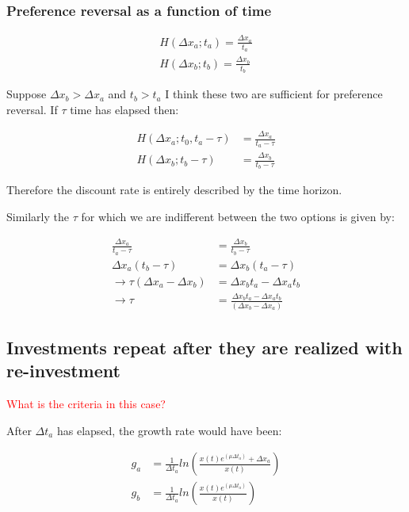 \documentclass{article}
\begin{document}
\subsubsection{Preference reversal as a function of time}

\begin{align*}
H(\Delta x_a; t_{a}) = \frac{\Delta x_a }{t_a} \\
H(\Delta x_b;t_{b}) = 
\frac{\Delta x_b}{t_b} 
\end{align*}

Suppose $\Delta x_b>\Delta x_a$ and $t_{b}>t_a$ I think these two are sufficient for preference reversal. If $\tau$ time has elapsed then:

\begin{align*}
H(\Delta x_a; t_0, t_{a}-\tau) &= \frac{\Delta x_a}{t_a-\tau} \\
H(\Delta x_b;t_{b}-\tau) &= \frac{\Delta x_b}{t_b-\tau} 
\end{align*}

Therefore the discount rate is entirely described by the time horizon. 

Similarly the $\tau$ for which we are indifferent between the two options is given by:

\begin{align*}
\frac{\Delta x_a}{t_a-\tau}&=\frac{\Delta x_b}{t_b-\tau} \\
\Delta x_a(t_b-\tau)&=\Delta x_b(t_a-\tau) \\
\rightarrow \tau(\Delta x_a-\Delta x_b) &= \Delta x_bt_a- \Delta x_at_b \\
\rightarrow \tau &= \frac{\Delta x_bt_a- \Delta x_at_b}{(\Delta x_b-\Delta x_a)} 
\end{align*}

\subsection{Investments repeat after they are realized with re-investment}

\textcolor{red}{What is the criteria in this case? }

After $\Delta t_a $ has elapsed, the growth rate would have been: 

\begin{align*}
g_a&= \frac{1}{\Delta t_a} ln 
\left( 
\frac{x(t)e^{(\mu \Delta t_a)}+\Delta x_a }{x(t)}
\right) \\
g_b&=\frac{1}{\Delta t_a} ln 
\left( 
\frac{x(t)e^{(\mu \Delta t_a)} }{x(t)}
\right) 
\end{align*}
\end{document}

